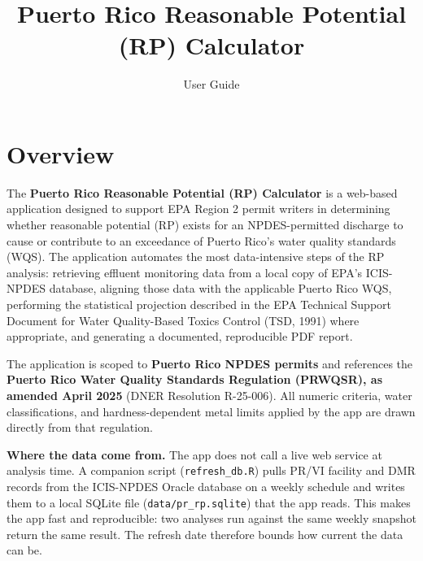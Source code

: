 \documentclass[
  11pt,
  letterpaper,
  DIV=11,
  numbers=noendperiod]{scrartcl}
\title{Puerto Rico Reasonable Potential (RP) Calculator}
\subtitle{User Guide}
\author{}
\date{}
\renewcommand*\contentsname{Table of contents}
\newcommand\contentsname{Table of contents}
\begin{document}
\maketitle

\renewcommand*\contentsname{Contents}
{
\hypersetup{linkcolor=black}
\setcounter{tocdepth}{3}
\tableofcontents
}

\section{Overview}\label{sec-overview}

The \textbf{Puerto Rico Reasonable Potential (RP) Calculator} is a
web-based application designed to support EPA Region 2 permit writers in
determining whether reasonable potential (RP) exists for an
NPDES-permitted discharge to cause or contribute to an exceedance of
Puerto Rico's water quality standards (WQS). The application automates
the most data-intensive steps of the RP analysis: retrieving effluent
monitoring data from a local copy of EPA's ICIS-NPDES database, aligning
those data with the applicable Puerto Rico WQS, performing the
statistical projection described in the EPA Technical Support Document
for Water Quality-Based Toxics Control (TSD, 1991) where appropriate,
and generating a documented, reproducible PDF report.

The application is scoped to \textbf{Puerto Rico NPDES permits} and
references the \textbf{Puerto Rico Water Quality Standards Regulation
(PRWQSR), as amended April 2025} (DNER Resolution R-25-006). All numeric
criteria, water classifications, and hardness-dependent metal limits
applied by the app are drawn directly from that regulation.

\begin{tcolorbox}[enhanced jigsaw, arc=.35mm, bottomrule=.15mm, bottomtitle=1mm, breakable, colback=white, colbacktitle=quarto-callout-note-color!10!white, colframe=quarto-callout-note-color-frame, coltitle=black, left=2mm, leftrule=.75mm, opacityback=0, opacitybacktitle=0.6, rightrule=.15mm, title=\textcolor{quarto-callout-note-color}{\faInfo}\hspace{0.5em}{Note}, titlerule=0mm, toprule=.15mm, toptitle=1mm]

\textbf{Where the data come from.} The app does not call a live web
service at analysis time. A companion script (\texttt{refresh\_db.R})
pulls PR/VI facility and DMR records from the ICIS-NPDES Oracle database
on a weekly schedule and writes them to a local SQLite file
(\texttt{data/pr\_rp.sqlite}) that the app reads. This makes the app
fast and reproducible: two analyses run against the same weekly snapshot
return the same result. The refresh date therefore bounds how current
the data can be.

\end{tcolorbox}
\end{document}
